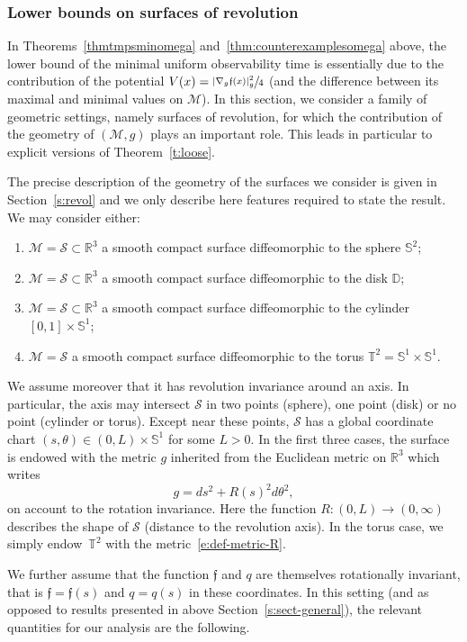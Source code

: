 \documentclass[11pt]{article}
\numberwithin{equation}{section}
\theoremstyle{definition}
\newcommand{\M}{\ensuremath{\mathcal M}}
\newcommand{\calS}{\ensuremath{\mathcal S}}
\newcommand{\mb}[1]{\ensuremath{\mathbb{#1}}}
\newcommand{\ID}{\ensuremath{\mathbb D}}
\newcommand{\R}{{\mb{R}}}
\newcommand{\bS}{\ensuremath{\mathbb S}}
\newcommand{\T}{\ensuremath{\mathbb T}}
\newcommand{\f}{\ensuremath{\mathfrak{f}}}
\begin{document}
\subsubsection{Lower bounds on surfaces of revolution}
\label{s:revol-intro}
In Theorems~\ref{thmtmpsminomega} and~\ref{thm:counterexamplesomega} above, the lower bound of the minimal uniform observability time is essentially due to the contribution of the potential $V(x) = \sfrac{|\nabla_g \f(x)|_g^2}{4}$ (and the difference between its maximal and minimal values on $\M$).
In this section, we consider a family of geometric settings, namely surfaces of revolution, for which the contribution of the geometry of $(\M,g)$ plays an important role.
This leads in particular to explicit versions of Theorem~\ref{t:loose}.

The precise description of the geometry of the surfaces we consider is given in Section~\ref{s:revol} and we only describe here features required to state the result.
We may consider either:
\begin{enumerate}
\item $\M =\calS \subset \R^3$ a smooth compact surface diffeomorphic to the sphere $\bS^2$;
\item $\M =\calS \subset \R^3$ a smooth compact surface diffeomorphic to the disk $\ID$;
\item $\M =\calS \subset \R^3$ a smooth compact surface diffeomorphic to the cylinder $[0,1]\times \bS^1$;
\item $\M =\calS$ a smooth compact surface diffeomorphic to the torus $\T^2 = \bS^1\times \bS^1$.
\end{enumerate}
We assume moreover that it has revolution invariance around an axis. In particular, the axis may intersect $\calS$ in two points (sphere), one point (disk) or no point (cylinder or torus). Except near these points, $\calS$ has a global coordinate chart $(s,\theta)\in(0,L)\times \bS^1$ for some $L>0$.
In the first three cases, the surface is endowed with the metric $g$ inherited from the Euclidean metric on $\R^3$ which writes
\begin{equation}
\label{e:def-metric-R}
g = ds^2 +R(s)^2 d\theta^2,
\end{equation}
on account to the rotation invariance.
Here the function $R:(0,L)\to (0,\infty)$ describes the shape of $\calS$ (distance to the revolution axis).
In the torus case, we simply endow~$\T^2$ with the metric~\eqref{e:def-metric-R}.

We further assume that the function $\f$ and $q$ are themselves rotationally invariant, that is $\f=\f(s)$ and $q=q(s)$ in these coordinates.
In this setting (and as opposed to results presented in above Section~\ref{s:sect-general}), the relevant quantities for our analysis are the following.
\end{document}
